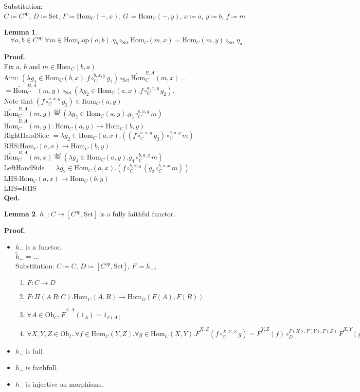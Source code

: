 \documentclass[10pt,a4paper]{article}
\theoremstyle{definition}
\newtheorem{lemma}{Lemma}[section]
\newcommand{\Ob}{{\mbox{Ob}}}
\newcommand{\Hom}{{\mbox{Hom}}}
\newcommand{\HomMor}{{\widetilde{\Hom}\mbox{}}}
\newcommand{\FMor}{{\widetilde{F}\mbox{}}}
\newcommand{\op}{{\mbox{op}}}
\newcommand{\defi}{{\mbox{def}}}
\newcommand{\eqdef}{{\stackrel{\defi}{=}}}
\newcommand{\Set}{{\mbox{Set}}}
\newcommand{\myprf}{\noindent\textbf{Proof.}}
\newcommand{\myqed}{\noindent\textbf{Qed.}}
\begin{document}
Substitution:\\
$C \coloneqq C^\op$, $D \coloneqq \Set$, $F \coloneqq \Hom_C(-,x)$, $G \coloneqq \Hom_C(-,y)$, $x \coloneqq a$, $y \coloneqq b$, $f \coloneqq m$
\begin{lemma}
$$\forall a,b\in C^\op. \forall m\in \Hom_C\op (a,b).\eta_b \circ_\Set \Hom_C(m,x)=\Hom_C(m,y)\circ_\Set\eta_a$$
\end{lemma}
\myprf\\
Fix $a$, $b$ and $m\in\Hom_C(b,a)$.\\
Aim: $(\lambda g_1 \in \Hom_C(b,x). f\circ^{b,x,y}_C g_1)\circ_\Set \HomMor_C^{B,A}(m,x) = $\\
$=\HomMor_C^{B,A}(m,y) \circ_\Set (\lambda g_2 \in \Hom_C(a,x). f\circ^{a,x,y}_C g_2)$.\\
Note that $(f\circ^{a,x,y}_C g_2) \in \Hom_C(a,y)$\\
$\HomMor_C^{B,A}(m,y) \eqdef (\lambda g_3 \in \Hom_C(a,y). g_3\circ^{b,a,y}_C m)$\\
$\HomMor_C^{B,A}(m,y) : \Hom_C(a,y) \to \Hom_C(b,y)$\\
RightHandSide $= \lambda g_2 \in \Hom_C(a,x). ((f \circ_C^{a,x,y} g_2) \circ_C^{b,a,y} m )$\\
RHS:$\Hom_C(a,x) \to \Hom_C(b,y)$\\
$\HomMor_C^{B,A}(m,x) \eqdef (\lambda g_4 \in \Hom_C(a,y). g_4\circ^{b,a,y}_C m)$\\
LeftHandSide $= \lambda g_2 \in \Hom_C(a,x). (f \circ_C^{b,x,y} (g_2 \circ_C^{b,a,x} m ))$\\
LHS:$\Hom_C(a,x) \to \Hom_C(b,y)$\\
LHS=RHS\\
\myqed
\begin{lemma}
$h_{-}:C\rightarrow [C^{op},\Set]$ is a fully faithful functor.
\end{lemma}
\myprf
\begin{itemize}
\item $h_-$ is a functor.\\
$\widetilde{h}_-$ = ...\\
Substitution: $C\coloneqq C$, $D\coloneqq [C^\op,\Set]$, $F\coloneqq h_-$,
\begin{enumerate}
\item $F:C \to D$
\item $\FMor:\Pi(A\ B:C).\Hom_C(A,B) \to \Hom_D(F(A), F(B))$
\item $\forall A\in \Ob_C, \FMor^{A,A}(1_A)=1_{F(A)}$
\item $\forall X,Y,Z \in \Ob_C.\forall f\in\Hom_C(Y,Z).\forall g\in\Hom_C(X,Y). \FMor^{X,Z}(f\circ_C^{X,Y,Z} g)=\FMor^{Y,Z}(f)\circ_D^{F(X),F(Y),F(Z)} \FMor^{X,Y}(g)$
\end{enumerate}
\item $h_-$ is full.
\item $h_-$ is faithfull.
\item $h_-$ is injective on morphisms.
\end{itemize}
\end{document}
